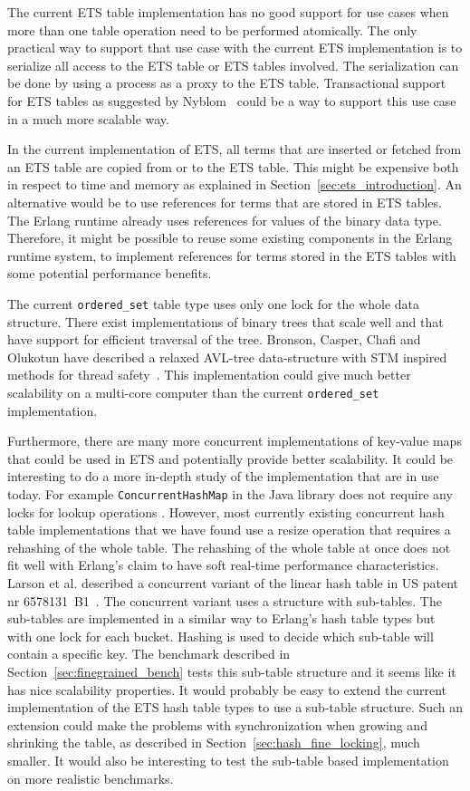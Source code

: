 \documentclass[aps,pre,preprint,nofootinbib]{revtex4}
\begin{document}
The current ETS table implementation has no good support for use cases when more than one table operation need to be performed atomically.
The only practical way to support that use case with the current ETS implementation is to serialize all access to the ETS table or ETS tables involved.
The serialization can be done by using a process as a proxy to the ETS table.
Transactional support for ETS tables as suggested by Nyblom~\cite{PatrikErlangTrans} could be a way to support this use case in a much more scalable way.

In the current implementation of ETS, all terms that are inserted or fetched from an ETS table are copied from or to the ETS table.
This might be expensive both in respect to time and memory as explained in Section~\ref{sec:ets_introduction}.
An alternative would be to use references for terms that are stored in ETS tables.
The Erlang runtime already uses references for values of the binary data type.
Therefore, it might be possible to reuse some existing components in the Erlang runtime system, to implement references for terms stored in the ETS tables with some potential performance benefits.


The current \verb|ordered_set| table type uses only one lock for the whole data structure.
There exist implementations of binary trees that scale well and that have support for efficient traversal of the tree.
Bronson, Casper, Chafi and Olukotun have described a relaxed AVL-tree data-structure with STM inspired methods for thread safety~\cite{BronsonPracTree}.
This implementation could give much better scalability on a multi-core computer than the current \verb|ordered_set| implementation.

Furthermore, there are many more concurrent implementations of key-value maps that could be used in ETS and potentially provide better scalability.
It could be interesting to do a more in-depth study of the implementation that are in use today.
For example \verb|ConcurrentHashMap| in the Java library does not require any locks for lookup operations \cite{BrianConcHashMap}.
However, most currently existing concurrent hash table implementations that we have found use a resize operation that requires a rehashing of the whole table.
The rehashing of the whole table at once does not fit well with Erlang's claim to have soft real-time performance characteristics.
Larson et al. described a concurrent variant of the linear hash table in US patent nr 6578131~B1~\cite{USPATENT6578131B1}.
The concurrent variant uses a structure with sub-tables.
The sub-tables are implemented in a similar way to Erlang's hash table types but with one lock for each bucket.
Hashing is used to decide which sub-table will contain a specific key.
The benchmark described in Section~\ref{sec:finegrained_bench} tests this sub-table structure and it seems like it has nice scalability properties. 
It would probably be easy to extend the current implementation of the ETS hash table types to use a sub-table structure.
Such an extension could make the problems with synchronization when growing and shrinking the table, as described in Section~\ref{sec:hash_fine_locking}, much smaller.
It would also be interesting to test the sub-table based implementation on more realistic benchmarks.
\end{document}
